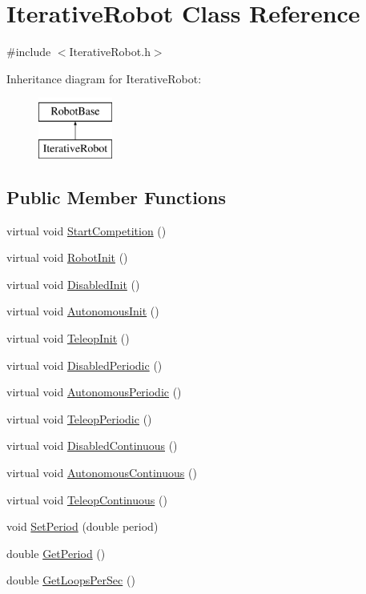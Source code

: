 \hypertarget{classIterativeRobot}{
\section{IterativeRobot Class Reference}
\label{classIterativeRobot}
}


{\ttfamily \#include $<$IterativeRobot.h$>$}

Inheritance diagram for IterativeRobot:\begin{figure}[H]
\begin{center}
\leavevmode
\includegraphics[height=2.000000cm]{classIterativeRobot}
\end{center}
\end{figure}
\subsection*{Public Member Functions}
\begin{DoxyCompactItemize}
\item 
virtual void \hyperlink{classIterativeRobot_ab0af04a781b0390981b9f0dd75358515}{StartCompetition} ()
\item 
virtual void \hyperlink{classIterativeRobot_a5296334b4a48ad2123c29f49209b9f62}{RobotInit} ()
\item 
virtual void \hyperlink{classIterativeRobot_a428a5875274cb886730530d633a50db9}{DisabledInit} ()
\item 
virtual void \hyperlink{classIterativeRobot_aa936c0a4526e12e32defd50609cca90c}{AutonomousInit} ()
\item 
virtual void \hyperlink{classIterativeRobot_a7365e781f0a04674b94bb1fb5767d83e}{TeleopInit} ()
\item 
virtual void \hyperlink{classIterativeRobot_a00265f02550b12295ca2cffde2c9c838}{DisabledPeriodic} ()
\item 
virtual void \hyperlink{classIterativeRobot_ac579e155cc4613ced00d5e740cf98667}{AutonomousPeriodic} ()
\item 
virtual void \hyperlink{classIterativeRobot_a3336d7f71d644e646dba70839f4f4672}{TeleopPeriodic} ()
\item 
virtual void \hyperlink{classIterativeRobot_a86e595ec2e7e645c8ae246243d6a16b8}{DisabledContinuous} ()
\item 
virtual void \hyperlink{classIterativeRobot_a766544e4b37b525b2a5d075e90e81b9e}{AutonomousContinuous} ()
\item 
virtual void \hyperlink{classIterativeRobot_afdfd6d7b231332af5d6277cb6e91bdfa}{TeleopContinuous} ()
\item 
void \hyperlink{classIterativeRobot_a1e49eb27408751ea8ce757bfe38717e2}{SetPeriod} (double period)
\item 
double \hyperlink{classIterativeRobot_a9752aaefce11839ea809b2a3326e937f}{GetPeriod} ()
\item 
double \hyperlink{classIterativeRobot_af8ada1ff1b92b0b678f1c959463cc460}{GetLoopsPerSec} ()
\end{DoxyCompactItemize}
